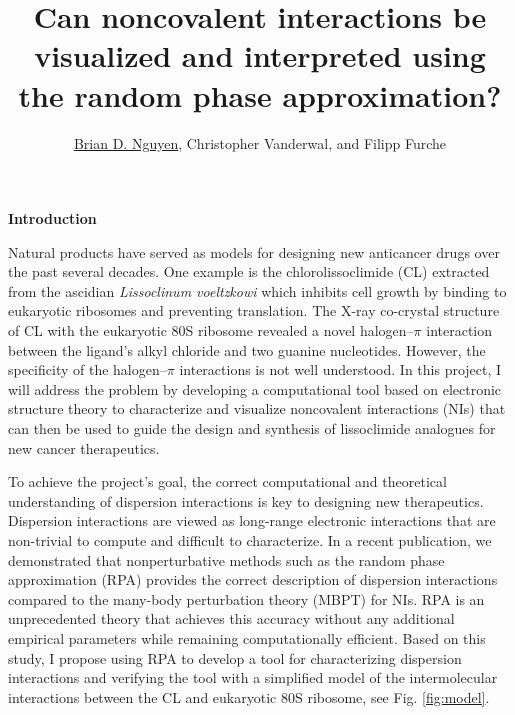 \documentclass[11pt]{article}
\title{\vspace{-0.8in}\textbf{Can noncovalent interactions be visualized
    and interpreted using the random phase approximation?}}
\author{\underline{Brian D. Nguyen}, Christopher Vanderwal, and Filipp Furche}
\date{}%
\begin{document}
\maketitle
\vspace{-0.4in}

\textbf{Introduction}

Natural products have served as models for designing new anticancer
drugs over the past several decades.\autocite{Dias12Metabolites2p303,Butler04JNatProd67p2141}
One example is the chlorolissoclimide (CL) extracted from the ascidian
\textit{Lissoclinum voeltzkowi} which inhibits cell growth by binding to
eukaryotic ribosomes and preventing translation.\autocite{Robert06RNA12p717}
The X-ray co-crystal structure of CL with the eukaryotic 80S ribosome revealed
a novel halogen--$\pi$ interaction between the ligand's alkyl chloride and two
guanine nucleotides.\autocite{Imai08ProteinScience17p1129,Konst2017} 
However, the specificity of the halogen--$\pi$ interactions is not well
understood. In this project, I will address the problem by developing a
computational tool based on electronic structure theory to characterize
and visualize noncovalent interactions (NIs) that can then be used to
guide the design and synthesis of lissoclimide analogues for new cancer
therapeutics.

To achieve the project's goal, the correct computational and theoretical
understanding of dispersion interactions is key to designing new therapeutics.
Dispersion interactions are viewed as long-range electronic interactions that
are non-trivial to compute and difficult to characterize. In a recent publication,
we demonstrated that nonperturbative methods such as the random phase approximation
(RPA) provides the correct description of dispersion interactions compared
to the many-body perturbation theory (MBPT) for NIs.\autocite{Nguyen20JChemTheoryComput16p2258}
RPA is an unprecedented theory that achieves this accuracy without any
additional empirical parameters while remaining computationally efficient.
Based on this study, I propose using RPA to develop a tool for characterizing
dispersion interactions and verifying the tool with a simplified model of the
intermolecular interactions between the CL and eukaryotic 80S ribosome, see
Fig. \ref{fig:model}.
\end{document}
